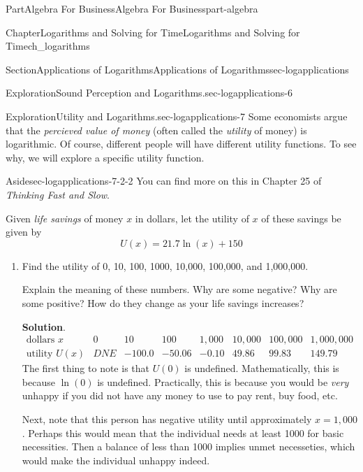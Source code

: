 \documentclass[oneside,10pt,]{tufte-book}
\newcommand{\blocktitlefont}{\relax}
\numberwithin{equation}{chapter}
\begin{document}
\begin{partptx}{Part}{Algebra For Business}{}{Algebra For Business}{}{}{part-algebra}
\begin{chapterptx}{Chapter}{Logarithms and Solving for Time}{}{Logarithms and Solving for Time}{}{}{ch_logarithms}
\begin{sectionptx}{Section}{Applications of Logarithms}{}{Applications of Logarithms}{}{}{sec-logapplications}
\begin{exploration}{Exploration}{Sound Perception and Logarithms.}{sec-logapplications-6}
\begin{enumerate}[font=\bfseries,label=(\alph*),ref=\alph*]
\end{enumerate}%
\end{exploration}%
%
\begin{exploration}{Exploration}{Utility and Logarithms.}{sec-logapplications-7}%
Some economists argue that the \emph{percieved value of money} (often called the \emph{utility} of money) is logarithmic. Of course, different people will have different utility functions. To see why, we will explore a specific utility function.%
\begin{aside}{Aside}{}{sec-logapplications-7-2-2}%
You can find more on this in Chapter 25 of \emph{Thinking Fast and Slow}. %
\end{aside}
Given \emph{life savings} of money \(x\) in dollars, let the utility of \textdollar{}\(x\) of these savings be given by%
\begin{equation*}
U(x) = 21.7\ln(x) + 150
\end{equation*}
%
\begin{enumerate}[font=\bfseries,label=(\alph*),ref=\alph*]%
\item{}Find the utility of \textdollar{}0, \textdollar{}10, \textdollar{}100, \textdollar{}1000, \textdollar{}10,000, \textdollar{}100,000, and \textdollar{}1,000,000.%
\par
Explain the meaning of these numbers.  Why are some negative? Why are some positive?  How do they change as your life savings increases?%
\par\smallskip%
\noindent\textbf{\blocktitlefont Solution}.\hypertarget{sec-logapplications-7-3-2}{}\quad{}%
\begin{equation*}
\begin{array}{c|c|c|c|c|c|c|c}
\text{dollars }x         
&  0 
&  10   
&  100  
&  1,000  
&  10,000 
&  100,000
&  1,000,000
\\ \hline
\text{utility }U(x)
& DNE
& -100.0	
& -50.06
& -0.10
& 49.86
& 99.83
& 149.79
\end{array}
\end{equation*}
The first thing to note is that \(U(0)\) is undefined.  Mathematically, this is because \(\ln(0)\) is undefined.  Practically, this is because you would be \emph{very} unhappy if you did not have any money to use to pay rent, buy food, etc.%
\par
Next, note that this person has negative utility until approximately \(x=1,000\).  Perhaps this would mean that the individual needs at least \textdollar{}1000 for basic necessities.  Then a balance of less than \textdollar{}1000 implies unmet necesseties, which would make the individual unhappy indeed.%

\end{enumerate}
\end{exploration}
\end{sectionptx}
\end{chapterptx}
\end{partptx}
\end{document}
